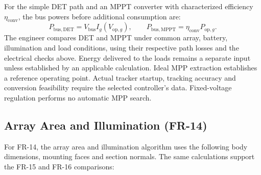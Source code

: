 For the simple DET path and an MPPT converter with characterized efficiency $\eta_{\mathrm{conv}}$, the bus powers before additional consumption are:
\begin{equation}
    P_{\mathrm{bus,DET}}=V_{\mathrm{bus}}I_g(V_{\mathrm{op},g}),
    \qquad P_{\mathrm{bus,MPPT}}=\eta_{\mathrm{conv}}P_{\mathrm{op},g}.
    \label{eq:solar-delivered-power}
\end{equation}
The engineer compares DET and MPPT under common array, battery, illumination and load conditions, using their respective path losses and the electrical checks above. Energy delivered to the loads remains a separate input unless established by an applicable calculation. Ideal MPP extraction establishes a reference operating point. Actual tracker startup, tracking accuracy and conversion feasibility require the selected controller's data. Fixed-voltage regulation performs no automatic MPP search.

\subsection{Array Area and Illumination (FR-14)}
For FR-14, the array area and illumination algorithm uses the following body dimensions, mounting faces and section normals. The same calculations support the FR-15 and FR-16 comparisons:

